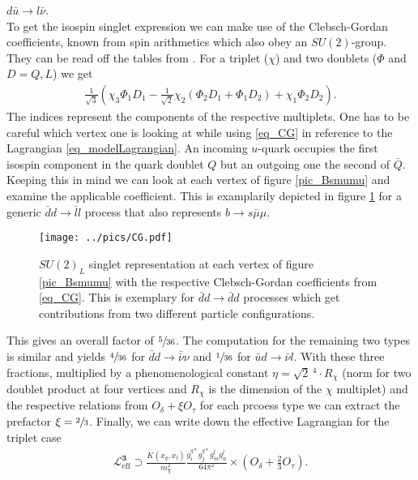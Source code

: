 $d \bar u\rightarrow l\bar\nu$. \\
\noindent To get the isospin singlet expression we can make use of the Clebsch-Gordan coefficients, known from spin arithmetics which also obey an $SU(2)$-group.
They can be read off the tables from \cite{PDG}. For a triplet ($\chi$) and two doublets ($\Phi$ and $D=Q,L$) we get
\begin{align}
 \frac{1}{\sqrt{3}}\left(\chi_3\Phi_1D_1 - \frac{1}{\sqrt{2}}\chi_2\left(\Phi_2D_1+\Phi_1 D_2\right) + \chi_1\Phi_2D_2 \right).
 \label{eq_CG}
\end{align}
The indices represent the components of the respective multiplets. One has to be careful which vertex one is looking at while using \eqref{eq_CG} in reference
to the Lagrangian \eqref{eq_modelLagrangian}. An incoming $u$-quark occupies the first isospin component in the quark doublet $Q$ but an outgoing one the 
second of $\bar Q$. Keeping this in mind we can look at each vertex of figure \ref{pic_Bsmumu} and examine the applicable coefficient. This is examplarily
depicted in figure \ref{pic_CG} for a generic $\bar d d\rightarrow \bar l l$ process that also represents $ b  \rightarrow s\bar \mu \mu$.
\begin{figure}[t]
 \texttt{[image: ../pics/CG.pdf]}
 \caption{$SU(2)_L$ singlet representation at each vertex of figure \ref{pic_Bsmumu} with the respective Clebsch-Gordan coefficients from \eqref{eq_CG}. 
 This is exemplary for $\bar d d\rightarrow \bar d d$ processes which get contributions from two different particle configurations.}
 \label{pic_CG}
\end{figure}
This gives an overall factor of $\sfrac{5}{36}$. The computation for the remaining two types is similar and yields $\sfrac{4}{36}$ for 
$\bar d d\rightarrow \bar \bar \nu \nu$ and $\sfrac{1}{36}$ for $\bar u d \rightarrow \bar \nu l$. With these three fractions, multiplied by a 
phenomenological constant $\eta=\sqrt{2}\,^4\cdot R_\chi$ (norm for two doublet product at four vertices and $R_\chi$ is the dimension of the $\chi$ multiplet) 
and the respective relations from $O_\delta + \xi O_\tau$ for each prcoess type 
we can extract the prefactor $\xi=\sfrac23$. Finally, we can write down the effective Lagrangian for the triplet case
\begin{align}
 \mathcal{L}^{\textbf{3}}_\text{eff} \supset \frac{K(x_q,x_l)}{m_\chi^2}\frac{g_i^{q*} g_j^{q*} g_m^l g_n^l}{64\pi^2}\times\left(O_\delta + \frac23 O_\tau\right).
 \label{eq_LagBSmumuModB}
\end{align}

